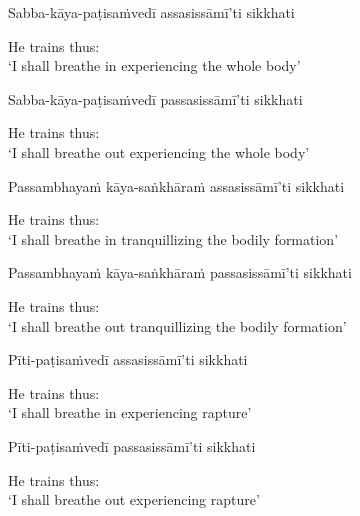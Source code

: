 Sabba-kāya-paṭisaṁvedī assasissāmī'ti sikkhati

\begin{english}
  He trains thus:\\
  `I shall breathe in experiencing the whole body'
\end{english}

\ifninebythirteen\clearpage\fi

Sabba-kāya-paṭisaṁvedī passasissāmī'ti sikkhati

\begin{english}
  He trains thus:\\
  `I shall breathe out experiencing the whole body'
\end{english}

\begin{pali-hang}
Passambhayaṁ kāya-saṅkhāraṁ assasissāmī'ti sikkhati
\end{pali-hang}

\begin{english}
  He trains thus:\\
  `I shall breathe in tranquillizing the bodily formation'\ifdigital\makeatletter\hyperlink{endnote68-appendix}\makeatother\fi
\end{english}

\begin{pali-hang}
Passambhayaṁ kāya-saṅkhāraṁ passasissāmī'ti sikkhati
\end{pali-hang}

\begin{english}
  He trains thus:\\
  `I shall breathe out tranquillizing the bodily formation'
\end{english}

Pīti-paṭisaṁvedī assasissāmī'ti sikkhati

\begin{english}
  He trains thus:\\
  `I shall breathe in experiencing rapture'
\end{english}

Pīti-paṭisaṁvedī passasissāmī'ti sikkhati

\begin{english}
  He trains thus:\\
  `I shall breathe out experiencing rapture'
\end{english}

